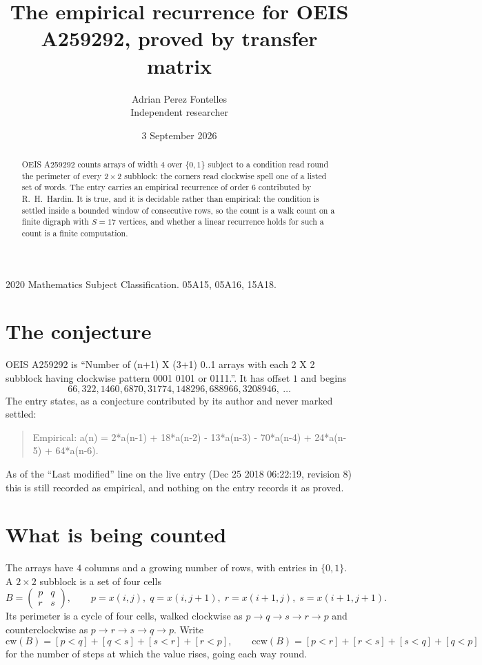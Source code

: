 \documentclass[11pt,a4paper]{article}
\title{The empirical recurrence for OEIS A259292, proved by transfer matrix}
\author{Adrian Perez Fontelles\\ \small Independent researcher}
\date{3 September 2026}
\theoremstyle{plain}
\theoremstyle{definition}
\begin{document}
\maketitle

\begin{abstract}
OEIS A259292 counts arrays of width $4$ over $\{0,1\}$ subject to a condition read round the
perimeter of every $2\times2$ subblock: the corners read clockwise spell one of a listed set of words. The entry carries an empirical recurrence of
order $6$ contributed by R.~H.~Hardin. It is true, and it is decidable rather than
empirical: the condition is settled inside a bounded window of consecutive rows, so the
count is a walk count on a finite digraph with $S=17$ vertices, and whether a linear
recurrence holds for such a count is a finite computation.
\end{abstract}

\noindent\small 2020 Mathematics Subject Classification. 05A15, 05A16, 15A18.\normalsize

\section{The conjecture}

OEIS A259292 is ``Number of (n+1) X (3+1) 0..1 arrays with each 2 X 2 subblock having clockwise pattern 0001 0101 or 0111.''. It has offset $1$ and begins
\[
66, 322, 1460, 6870, 31774, 148296, 688966, 3208946,\ \dots
\]
The entry states, as a conjecture contributed by its author and never marked settled:
\begin{quote}
Empirical: a(n) = 2*a(n-1) + 18*a(n-2) - 13*a(n-3) - 70*a(n-4) + 24*a(n-5) + 64*a(n-6).
\end{quote}
As of the ``Last modified'' line on the live entry (Dec 25 2018 06:22:19, revision 8) this is still
recorded as empirical, and nothing on the entry records it as proved.

\section{What is being counted}

The arrays have $4$ columns and a growing number of rows, with entries in $\{0,1\}$. A
$2\times2$ subblock is a set of four cells
\[
B=\begin{pmatrix} p & q \\ r & s \end{pmatrix},
\qquad p=x(i,j),\; q=x(i,j+1),\; r=x(i+1,j),\; s=x(i+1,j+1).
\]
Its perimeter is a cycle of four cells, walked clockwise as $p\to q\to s\to r\to p$ and
counterclockwise as $p\to r\to s\to q\to p$. Write
\[
\mathrm{cw}(B)=[p<q]+[q<s]+[s<r]+[r<p],\qquad
\mathrm{ccw}(B)=[p<r]+[r<s]+[s<q]+[q<p]
\]
for the number of steps at which the value rises, going each way round.
\end{document}
